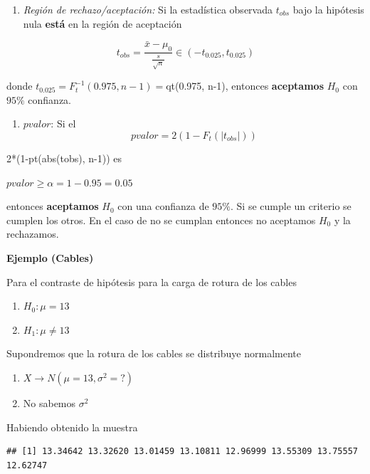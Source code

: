 \documentclass[
]{book}
\providecommand{\tightlist}{%
  \setlength{\itemsep}{0pt}\setlength{\parskip}{0pt}}
\begin{document}
\begin{enumerate}
\def\labelenumi{\arabic{enumi}.}
\setcounter{enumi}{1}
\tightlist
\item
  \emph{Región de rechazo/aceptación:} Si la estadística observada \(t_{obs}\) bajo la hipótesis nula \textbf{está} en la región de aceptación
\end{enumerate}

\[t_{obs}=\frac{\bar{x}-\mu_0}{\frac{s}{\sqrt{n}}} \in (-t_{0.025}, t_{0.025})\]

donde \(t_{0.025}=F_t^{-1}(0.975, n-1)=\)qt(0.975, n-1), entonces \textbf{aceptamos} \(H_0\) con \(95 \%\) confianza.

\begin{enumerate}
\def\labelenumi{\arabic{enumi}.}
\setcounter{enumi}{2}
\tightlist
\item
  \(pvalor\): Si el \[pvalor= 2 (1-F_t(|t_{obs}|))\]
\end{enumerate}

2*(1-pt(abs(tobs), n-1)) es

\(pvalor \geq \alpha =1-0.95=0.05\)

entonces \textbf{aceptamos} \(H_0\) con una confianza de \(95\%\). Si se cumple un criterio se cumplen los otros. En el caso de no se cumplan entonces no aceptamos \(H_0\) y la rechazamos.

\textbf{Ejemplo (Cables)}

Para el contraste de hipótesis para la carga de rotura de los cables

\begin{enumerate}
\def\labelenumi{\alph{enumi}.}
\tightlist
\item
  \(H_0:\mu = 13\)
\item
  \(H_1:\mu\neq 13\)
\end{enumerate}

Supondremos que la rotura de los cables se distribuye normalmente

\begin{enumerate}
\def\labelenumi{\arabic{enumi}.}
\tightlist
\item
  \(X \rightarrow N(\mu=13, \sigma^2=?)\)
\item
  No sabemos \(\sigma^2\)
\end{enumerate}

Habiendo obtenido la muestra

\begin{verbatim}
## [1] 13.34642 13.32620 13.01459 13.10811 12.96999 13.55309 13.75557 12.62747
\end{verbatim}
\end{document}

